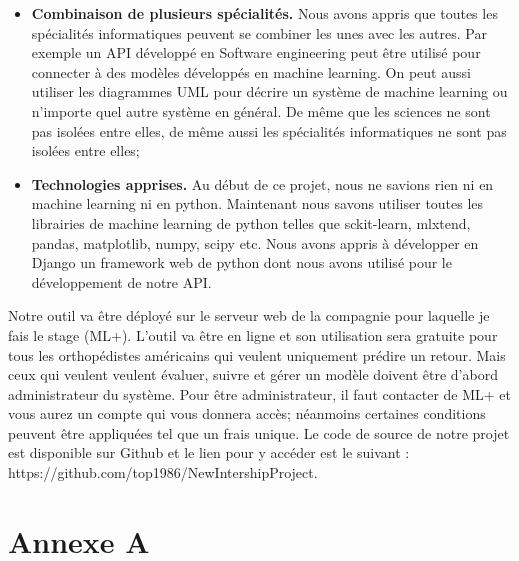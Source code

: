 \documentclass[12pt, french]{report}
\begin{document}
\begin{itemize}
\item \textbf{Combinaison de plusieurs spécialités.} Nous avons appris que toutes les spécialités informatiques peuvent se combiner les unes avec les autres. Par exemple un API développé en Software engineering peut être utilisé pour connecter à des modèles développés en machine learning. On peut aussi utiliser les diagrammes UML pour décrire un système de machine learning ou n'importe quel autre système en général. De même que les sciences ne sont pas isolées entre elles, de même aussi les spécialités informatiques ne sont pas isolées entre elles;
\item \textbf{Technologies apprises.}  Au début de ce projet, nous ne savions rien ni en machine learning ni en python. Maintenant nous savons utiliser toutes les librairies de machine learning de python telles que sckit-learn, mlxtend, pandas, matplotlib, numpy, scipy etc. Nous avons appris à développer en Django un framework web de python dont nous avons utilisé pour le développement de notre API. 
\end{itemize}

Notre outil va être déployé sur le serveur web de la compagnie pour laquelle je fais le stage (ML+). L'outil va être en ligne et son utilisation sera gratuite pour tous les orthopédistes américains qui veulent uniquement prédire un retour. Mais ceux qui veulent veulent évaluer, suivre et gérer un modèle doivent être d'abord administrateur du système. Pour être administrateur, il faut contacter de ML+ et vous aurez un compte qui vous donnera accès; néanmoins certaines conditions peuvent être appliquées tel que un frais unique. Le code de source de notre projet est disponible sur Github et le lien pour y accéder est le suivant : https://github.com/top1986/NewIntershipProject.   


\newpage

\appendix
\chapter{Annexe A}

\end{document}
